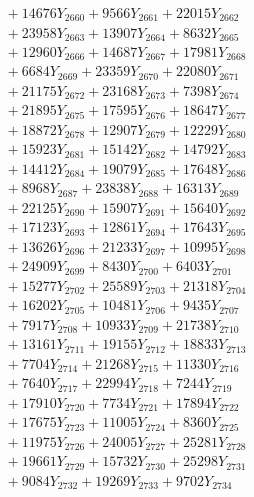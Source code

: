\documentclass[a4paper,10pt]{article}
\begin{document}
{\begin{align}
&\;  + 14676 Y_{2660} + 9566 Y_{2661} + 22015 Y_{2662} \\[0.3ex]
&\;  + 23958 Y_{2663} + 13907 Y_{2664} + 8632 Y_{2665} \\[0.3ex]
&\;  + 12960 Y_{2666} + 14687 Y_{2667} + 17981 Y_{2668} \\[0.5ex]\allowbreak
&\;  + 6684 Y_{2669} + 23359 Y_{2670} + 22080 Y_{2671} \\[0.3ex]
&\;  + 21175 Y_{2672} + 23168 Y_{2673} + 7398 Y_{2674} \\[0.3ex]
&\;  + 21895 Y_{2675} + 17595 Y_{2676} + 18647 Y_{2677} \\[0.3ex]
&\;  + 18872 Y_{2678} + 12907 Y_{2679} + 12229 Y_{2680} \\[0.3ex]
&\;  + 15923 Y_{2681} + 15142 Y_{2682} + 14792 Y_{2683} \\[0.3ex]
&\;  + 14412 Y_{2684} + 19079 Y_{2685} + 17648 Y_{2686} \\[0.3ex]
&\;  + 8968 Y_{2687} + 23838 Y_{2688} + 16313 Y_{2689} \\[0.3ex]
&\;  + 22125 Y_{2690} + 15907 Y_{2691} + 15640 Y_{2692} \\[0.3ex]
&\;  + 17123 Y_{2693} + 12861 Y_{2694} + 17643 Y_{2695} \\[0.3ex]
&\;  + 13626 Y_{2696} + 21233 Y_{2697} + 10995 Y_{2698} \\[0.5ex]\allowbreak
&\;  + 24909 Y_{2699} + 8430 Y_{2700} + 6403 Y_{2701} \\[0.3ex]
&\;  + 15277 Y_{2702} + 25589 Y_{2703} + 21318 Y_{2704} \\[0.3ex]
&\;  + 16202 Y_{2705} + 10481 Y_{2706} + 9435 Y_{2707} \\[0.3ex]
&\;  + 7917 Y_{2708} + 10933 Y_{2709} + 21738 Y_{2710} \\[0.3ex]
&\;  + 13161 Y_{2711} + 19155 Y_{2712} + 18833 Y_{2713} \\[0.3ex]
&\;  + 7704 Y_{2714} + 21268 Y_{2715} + 11330 Y_{2716} \\[0.3ex]
&\;  + 7640 Y_{2717} + 22994 Y_{2718} + 7244 Y_{2719} \\[0.3ex]
&\;  + 17910 Y_{2720} + 7734 Y_{2721} + 17894 Y_{2722} \\[0.3ex]
&\;  + 17675 Y_{2723} + 11005 Y_{2724} + 8360 Y_{2725} \\[0.3ex]
&\;  + 11975 Y_{2726} + 24005 Y_{2727} + 25281 Y_{2728} \\[0.5ex]\allowbreak
&\;  + 19661 Y_{2729} + 15732 Y_{2730} + 25298 Y_{2731} \\[0.3ex]
&\;  + 9084 Y_{2732} + 19269 Y_{2733} + 9702 Y_{2734} \\[0.3ex]

\end{align}}
\end{document}
